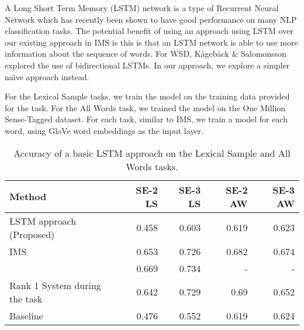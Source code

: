 A Long Short Term Memory (LSTM) network is a type of Recurrent Neural
Network which has recently been shown to have good performance on many
NLP classification tasks. 
The potential benefit of using an approach using LSTM over our existing
approach in IMS is this is that an LSTM  network is able to use more 
information about the sequence of words. 
For WSD, K{\aa}geb{\"a}ck \& Salomonsson  explored the use of bidirectional LSTMs. In our approach, we explore a simpler
na\"{\i}ve approach instead.

For the Lexical Sample tasks, we train the model on the training data
provided for the task. For the All Words task, we trained the model on
the One Million Sense-Tagged dataset. For each task, similar to IMS,
we train a model for each word, using GloVe word embeddings as the input layer.

\begin{table}[th]
	\caption{Accuracy of a basic LSTM approach on the Lexical
          Sample and All Words tasks.}
	\label{table:NN-LS}
	\begin{center}
		\begin{tabular}{| p{6cm} | r | r | r | r |}
			\hline
			\textbf{Method} & \textbf{SE-2 LS}  & \textbf{SE-3 LS} & \textbf{SE-2 AW}  & \textbf{SE-3 AW} \\
			\hline
			LSTM approach (Proposed) & 0.458  & 0.603 & 0.619 & 0.623 \\
			\hline
			IMS & 0.653 & 0.726 & 0.682 & 0.674 \\
            \hline
            \cite{kaageback2016word} & 0.669 & 0.734 & - & - \\
			\hline
			Rank 1 System during the task & 0.642 & 0.729 & 0.69 & 0.652 \\
			\hline
			Baseline & 0.476 & 0.552 & 0.619 & 0.624 \\
			\hline
		\end{tabular}
	\end{center}
\end{table}

